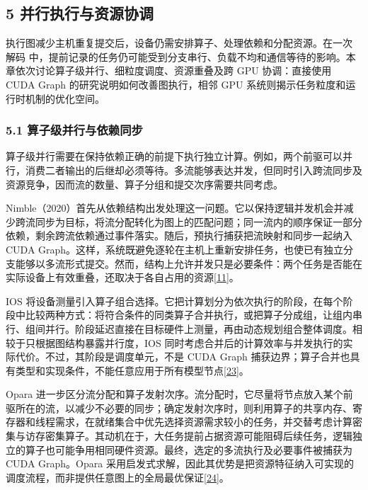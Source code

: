 \documentclass[UTF8,11pt,fontset=windows]{ctexart}
\begin{document}
\hypertarget{section-5}{%
\subsection{\texorpdfstring{\textbf{5 并行执行与资源协调}}{5 并行执行与资源协调}}\label{section-5}}

执行图减少主机重复提交后，设备仍需安排算子、处理依赖和分配资源。在一次 解码 中，提前记录的任务仍可能受到分支串行、负载不均和通信等待的影响。本章依次讨论算子级并行、细粒度调度、资源重叠及跨 GPU 协调：直接使用 CUDA Graph 的研究说明如何改善图执行，相邻 GPU 系统则揭示任务粒度和运行时机制的优化空间。

\hypertarget{section-5-1}{%
\subsubsection{\texorpdfstring{\textbf{5.1 算子级并行与依赖同步}}{5.1 算子级并行与依赖同步}}\label{section-5-1}}

算子级并行需要在保持依赖正确的前提下执行独立计算。例如，两个前驱可以并行，消费二者输出的后继却必须等待。多流能够表达并发，但同时引入跨流同步及资源竞争，因而流的数量、算子分组和提交次序需要共同考虑。

Nimble（2020）首先从依赖结构出发处理这一问题。它以保持逻辑并发机会并减少跨流同步为目标，将流分配转化为图上的匹配问题；同一流内的顺序保证一部分依赖，剩余跨流依赖通过事件落实。随后，预执行捕获把流映射和同步一起纳入 CUDA Graph。这样，系统既避免逐轮在主机上重新安排任务，也使已有独立分支能够以多流形式提交。然而，结构上允许并发只是必要条件：两个任务是否能在实际设备上有效重叠，还取决于各自占用的资源\protect\hyperlink{ref-11}{{[}11{]}}。

IOS 将设备测量引入算子组合选择。它把计算划分为依次执行的阶段，在每个阶段中比较两种方式：将符合条件的同类算子合并执行，或把算子分成组，让组内串行、组间并行。阶段延迟直接在目标硬件上测量，再由动态规划组合整体调度。相较于只根据图结构暴露并行度，IOS 同时考虑合并后的计算效率与并发执行的实际代价。不过，其阶段是调度单元，不是 CUDA Graph 捕获边界；算子合并也具有类型和实现条件，不能任意应用于所有模型节点\protect\hyperlink{ref-23}{{[}23{]}}。

Opara 进一步区分流分配和算子发射次序。流分配时，它尽量将节点放入某个前驱所在的流，以减少不必要的同步；确定发射次序时，则利用算子的共享内存、寄存器和线程需求，在就绪集合中优先选择资源需求较小的任务，并交替考虑计算密集与访存密集算子。其动机在于，大任务提前占据资源可能阻碍后续任务，逻辑独立的算子也可能争用相同硬件资源。最终，选定的多流执行及必要事件被捕获为 CUDA Graph。Opara 采用启发式求解，因此其优势是把资源特征纳入可实现的调度流程，而非提供任意图上的全局最优保证\protect\hyperlink{ref-24}{{[}24{]}}。
\end{document}
